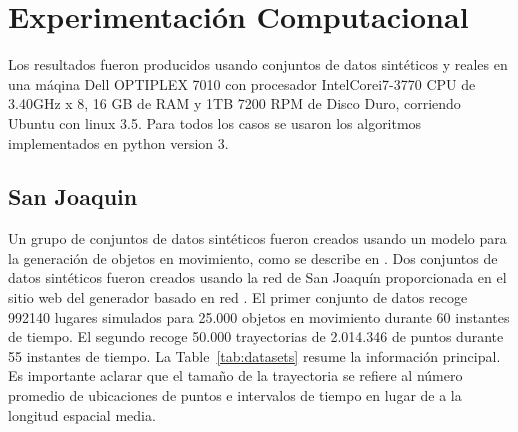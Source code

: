 \section{Experimentación Computacional}

Los resultados fueron producidos usando conjuntos de datos sintéticos y reales en una máqina
Dell OPTIPLEX 7010 con procesador Intel\textregistered Core\texttrademark  i7-3770 CPU de 3.40GHz x 8,
16 GB de RAM y 1TB 7200 RPM de Disco Duro, corriendo Ubuntu con linux 3.5. Para todos los casos se usaron
los algoritmos implementados en python version 3.

\subsection{San Joaquin}

Un grupo de conjuntos de datos sintéticos fueron creados usando un modelo para la generación de objetos en movimiento, como se describe en \cite{brinkhoff2002framework}.
Dos conjuntos de datos sintéticos fueron creados usando la red de San Joaquín proporcionada en el sitio web del generador basado en red \cite{Brin:2010:Online}.
El primer conjunto de datos recoge 992140 lugares simulados para 25.000 objetos en movimiento durante 60 instantes de tiempo. El segundo recoge 50.000 trayectorias
de 2.014.346 de puntos durante 55 instantes de tiempo. La Table~\ref{tab:datasets} resume la información principal. Es importante aclarar que el tamaño de la trayectoria se refiere al
número promedio de ubicaciones de puntos e intervalos de tiempo en lugar de a la longitud espacial media.


\begin{table}
\caption{Conjunto de datos sintéticos}
\label{tab:datasets}
\centering
{}
\end{table}

